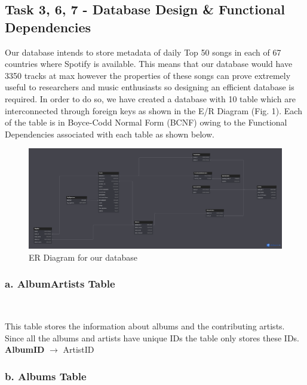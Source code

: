 \documentclass[conference]{IEEEtran}
\begin{document}
\subsection{\textbf{Task 3, 6, 7} - Database Design \& Functional Dependencies}

Our database intends to store metadata of daily Top 50 songs in each of 67 countries where Spotify is available. This means that our database would have 3350 tracks at max however the properties of these songs can prove extremely useful to researchers and music enthusiasts so designing an efficient database is required. In order to do so, we have created a database with 10 table which are interconnected through foreign keys as shown in the E/R Diagram (Fig. 1). Each of the table is in Boyce-Codd Normal Form (BCNF) owing to the Functional Dependencies associated with each table as shown below.  

\begin{figure}
    \includegraphics[width=\linewidth]{el_diagram.png}
    \caption{ER Diagram for our database}
    \label{Fig:ER Diagram}
\end{figure}

\subsubsection*{a. \textbf{AlbumArtists} Table} \

This table stores the information about albums and the contributing artists. Since all the albums and artists have unique IDs the table only stores these IDs. \linebreak \linebreak
\textbf{AlbumID} $\to$ ArtistID \linebreak

\subsubsection*{b. \textbf{Albums} Table} \
\end{document}
